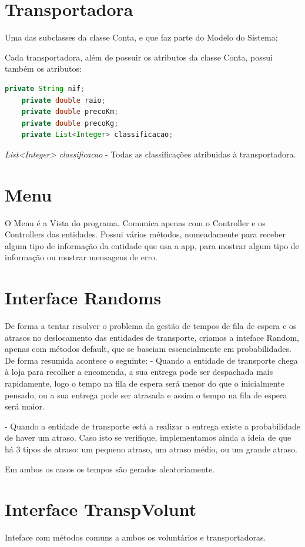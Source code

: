 \documentclass[a4paper]{report}
\begin{document}
	
	\section{Transportadora}
	Uma das subclasses da classe Conta, e que faz parte do Modelo do Sistema;
	
	Cada transportadora, além de possuir os atributos da classe Conta, possui também os atributos:
	\begin{lstlisting}[language=Java]
	private String nif;
	private double raio;
	private double precoKm;
	private double precoKg;
	private List<Integer> classificacao;
	\end{lstlisting}
	\textit{List<Integer> classificacao} - Todas as classificações atribuidas à transportadora.
	
	\section{Menu}
	O Menu é a Vista do programa. Comunica apenas com o Controller e os Controllers das entidades.
	Possui vários métodos, nomeadamente para receber algum tipo de informação da entidade que usa a app, para mostrar algum tipo de informação ou mostrar mensagens de erro.
	
	\section{Interface Randoms}
	De forma a tentar resolver o problema da gestão de tempos de fila de espera e os atrasos no deslocamento das entidades de transporte, criamos a inteface Random, apenas com métodos default, que se baseiam essencialmente em probabilidades.
	De forma resumida acontece o seguinte:
	 - Quando a entidade de transporte chega à loja para recolher a encomenda, a sua entrega pode ser despachada mais rapidamente, logo o tempo na fila de espera será menor do que o inicialmente pensado, ou a sua entrega pode ser atrasada e assim o tempo na fila de espera será maior.
	 
	 - Quando a entidade de transporte está a realizar a entrega existe a probabilidade de haver um atraso. Caso isto se verifique, implementamos ainda a ideia de que há 3 tipos de atraso: um pequeno atraso, um atraso médio, ou um grande atraso.
	 
	 Em ambos os casos os tempos são gerados aleatoriamente. 
	 
	  \section{Interface TranspVolunt}
	 Inteface com métodos comuns a ambos os voluntários e transportadoras.
	 
\end{document}
